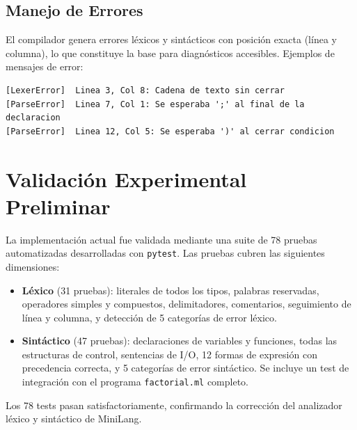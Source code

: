 \documentclass[conference]{IEEEtran}
\begin{document}
\subsection{Manejo de Errores}
El compilador genera errores léxicos y sintácticos con posición exacta (línea y columna), lo que constituye la base para diagnósticos accesibles. Ejemplos de mensajes de error:

\begin{lstlisting}[language={},numbers=none]
[LexerError]  Linea 3, Col 8: Cadena de texto sin cerrar
[ParseError]  Linea 7, Col 1: Se esperaba ';' al final de la declaracion
[ParseError]  Linea 12, Col 5: Se esperaba ')' al cerrar condicion
\end{lstlisting}

\section{Validación Experimental Preliminar}
La implementación actual fue validada mediante una suite de 78 pruebas automatizadas desarrolladas con \texttt{pytest}. Las pruebas cubren las siguientes dimensiones:
\begin{itemize}
    \item \textbf{Léxico} (31 pruebas): literales de todos los tipos, palabras reservadas, operadores simples y compuestos, delimitadores, comentarios, seguimiento de línea y columna, y detección de 5 categorías de error léxico.
    \item \textbf{Sintáctico} (47 pruebas): declaraciones de variables y funciones, todas las estructuras de control, sentencias de I/O, 12 formas de expresión con precedencia correcta, y 5 categorías de error sintáctico. Se incluye un test de integración con el programa \texttt{factorial.ml} completo.
\end{itemize}

Los 78 tests pasan satisfactoriamente, confirmando la corrección del analizador léxico y sintáctico de MiniLang.
\end{document}
